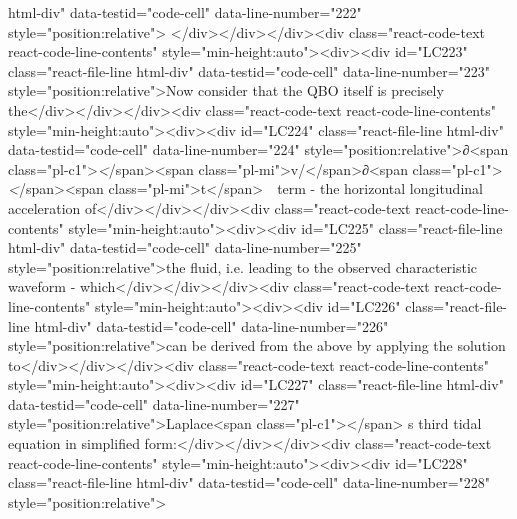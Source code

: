 {{html-div" data-testid="code-cell" data-line-number="222" style="position:relative">
</div></div></div><div class="react-code-text react-code-line-contents" style="min-height:auto"><div><div id="LC223" class="react-file-line html-div" data-testid="code-cell" data-line-number="223" style="position:relative">Now consider that the QBO itself is precisely the</div></div></div><div class="react-code-text react-code-line-contents" style="min-height:auto"><div><div id="LC224" class="react-file-line html-div" data-testid="code-cell" data-line-number="224" style="position:relative">∂<span class="pl-c1">\emph</span>{<span class="pl-mi">v/</span>}∂<span class="pl-c1">\emph</span>{<span class="pl-mi">t</span>}~~term - the horizontal longitudinal acceleration of</div></div></div><div class="react-code-text react-code-line-contents" style="min-height:auto"><div><div id="LC225" class="react-file-line html-div" data-testid="code-cell" data-line-number="225" style="position:relative">the fluid, i.e. leading to the observed characteristic waveform - which</div></div></div><div class="react-code-text react-code-line-contents" style="min-height:auto"><div><div id="LC226" class="react-file-line html-div" data-testid="code-cell" data-line-number="226" style="position:relative">can be derived from the above by applying the solution to</div></div></div><div class="react-code-text react-code-line-contents" style="min-height:auto"><div><div id="LC227" class="react-file-line html-div" data-testid="code-cell" data-line-number="227" style="position:relative">Laplace<span class="pl-c1">\textquotesingle</span> s third tidal equation in simplified form:</div></div></div><div class="react-code-text react-code-line-contents" style="min-height:auto"><div><div id="LC228" class="react-file-line html-div" data-testid="code-cell" data-line-number="228" style="position:relative">
}}

